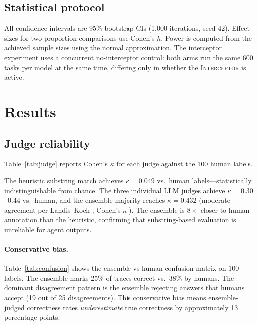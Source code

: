 \documentclass{ieeeaccess}
\newcommand{\interceptor}{\textsc{Interceptor}\xspace}
\begin{document}
\subsection{Statistical protocol}

All confidence intervals are 95\% bootstrap CIs (1{,}000 iterations,
seed 42).
Effect sizes for two-proportion comparisons use Cohen's $h$.
Power is computed from the achieved sample sizes using the normal
approximation.
The interceptor experiment uses a concurrent no-interceptor control:
both arms run the same 600 tasks per model at the same time, differing
only in whether the \interceptor{} is active.


\section{Results}
\label{sec:results}

\subsection{Judge reliability}
\label{sec:judge}

Table~\ref{tab:judge} reports Cohen's $\kappa$ for each judge against
the 100 human labels.

The heuristic substring match achieves $\kappa{=}0.049$ vs.\ human
labels---statistically indistinguishable from chance.
The three individual LLM judges achieve $\kappa{=}0.30$--$0.44$ vs.\
human, and the ensemble majority reaches $\kappa{=}0.432$ (moderate
agreement per Landis--Koch \cite{landis1977kappa};
Cohen's $\kappa$ \cite{cohen1960kappa}).
The ensemble is $8{\times}$ closer to human annotation than the
heuristic, confirming that substring-based evaluation is unreliable
for agent outputs.



\paragraph{Conservative bias.}
Table~\ref{tab:confusion} shows the ensemble-vs-human confusion matrix
on 100 labels.
The ensemble marks 25\% of traces correct vs.\ 38\% by humans.
The dominant disagreement pattern is the ensemble rejecting answers that
humans accept (19 out of 25 disagreements).
This conservative bias means ensemble-judged correctness rates
\emph{underestimate} true correctness by approximately 13 percentage
points.
\end{document}
